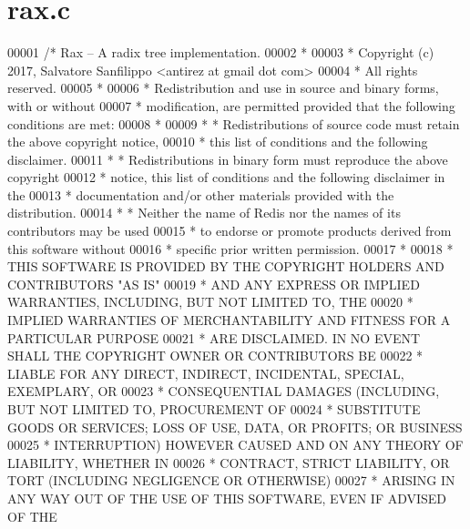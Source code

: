\hypertarget{rax_8c_source}{}\section{rax.\+c}
\label{rax_8c_source}

\begin{DoxyCode}
00001 \textcolor{comment}{/* Rax -- A radix tree implementation.}
00002 \textcolor{comment}{ *}
00003 \textcolor{comment}{ * Copyright (c) 2017, Salvatore Sanfilippo <antirez at gmail dot com>}
00004 \textcolor{comment}{ * All rights reserved.}
00005 \textcolor{comment}{ *}
00006 \textcolor{comment}{ * Redistribution and use in source and binary forms, with or without}
00007 \textcolor{comment}{ * modification, are permitted provided that the following conditions are met:}
00008 \textcolor{comment}{ *}
00009 \textcolor{comment}{ *   * Redistributions of source code must retain the above copyright notice,}
00010 \textcolor{comment}{ *     this list of conditions and the following disclaimer.}
00011 \textcolor{comment}{ *   * Redistributions in binary form must reproduce the above copyright}
00012 \textcolor{comment}{ *     notice, this list of conditions and the following disclaimer in the}
00013 \textcolor{comment}{ *     documentation and/or other materials provided with the distribution.}
00014 \textcolor{comment}{ *   * Neither the name of Redis nor the names of its contributors may be used}
00015 \textcolor{comment}{ *     to endorse or promote products derived from this software without}
00016 \textcolor{comment}{ *     specific prior written permission.}
00017 \textcolor{comment}{ *}
00018 \textcolor{comment}{ * THIS SOFTWARE IS PROVIDED BY THE COPYRIGHT HOLDERS AND CONTRIBUTORS "AS IS"}
00019 \textcolor{comment}{ * AND ANY EXPRESS OR IMPLIED WARRANTIES, INCLUDING, BUT NOT LIMITED TO, THE}
00020 \textcolor{comment}{ * IMPLIED WARRANTIES OF MERCHANTABILITY AND FITNESS FOR A PARTICULAR PURPOSE}
00021 \textcolor{comment}{ * ARE DISCLAIMED. IN NO EVENT SHALL THE COPYRIGHT OWNER OR CONTRIBUTORS BE}
00022 \textcolor{comment}{ * LIABLE FOR ANY DIRECT, INDIRECT, INCIDENTAL, SPECIAL, EXEMPLARY, OR}
00023 \textcolor{comment}{ * CONSEQUENTIAL DAMAGES (INCLUDING, BUT NOT LIMITED TO, PROCUREMENT OF}
00024 \textcolor{comment}{ * SUBSTITUTE GOODS OR SERVICES; LOSS OF USE, DATA, OR PROFITS; OR BUSINESS}
00025 \textcolor{comment}{ * INTERRUPTION) HOWEVER CAUSED AND ON ANY THEORY OF LIABILITY, WHETHER IN}
00026 \textcolor{comment}{ * CONTRACT, STRICT LIABILITY, OR TORT (INCLUDING NEGLIGENCE OR OTHERWISE)}
00027 \textcolor{comment}{ * ARISING IN ANY WAY OUT OF THE USE OF THIS SOFTWARE, EVEN IF ADVISED OF THE}

\end{DoxyCode}
